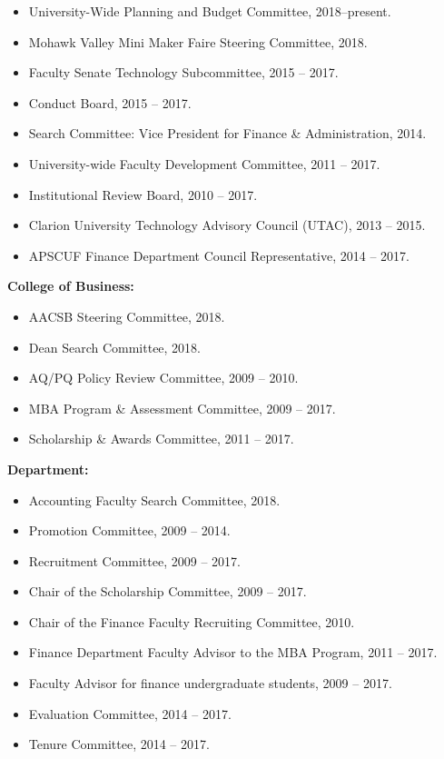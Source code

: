 \documentclass[9pt]{article}
\begin{document}
\begin{itemize}[noitemsep, nolistsep]
\item University-Wide Planning and Budget Committee, 2018--present.
\item Mohawk Valley Mini Maker Faire Steering Committee, 2018.
\item Faculty Senate Technology Subcommittee, 2015 -- 2017.
\item Conduct Board, 2015 -- 2017.
\item Search Committee: Vice President for Finance \& Administration, 2014.
\item University-wide Faculty Development Committee, 2011 -- 2017.
\item Institutional Review Board, 2010 -- 2017. 
\item Clarion University Technology Advisory Council (UTAC), 2013 -- 2015. 
\item APSCUF Finance Department Council Representative, 2014 -- 2017. 
\end{itemize}
{\bf College of Business:}
\begin{itemize}[noitemsep, nolistsep]
\item AACSB Steering Committee, 2018.
\item Dean Search Committee, 2018.
\item AQ/PQ Policy Review Committee, 2009 -- 2010.
\item MBA Program \& Assessment Committee, 2009 -- 2017.
\item Scholarship \& Awards Committee, 2011 -- 2017.
\end{itemize}
{\bf Department:}
\begin{itemize}[noitemsep, nolistsep]
\item Accounting Faculty Search Committee, 2018.
\item Promotion Committee, 2009 -- 2014.
\item Recruitment Committee, 2009 -- 2017.
\item Chair of the Scholarship Committee, 2009 -- 2017.
\item Chair of the Finance Faculty Recruiting Committee, 2010.
\item Finance Department Faculty Advisor to the MBA Program, 2011 -- 2017.
\item Faculty Advisor for finance undergraduate students, 2009 -- 2017.
\item Evaluation Committee, 2014 -- 2017.
\item Tenure Committee, 2014 -- 2017.
\end{itemize}
\end{document}

